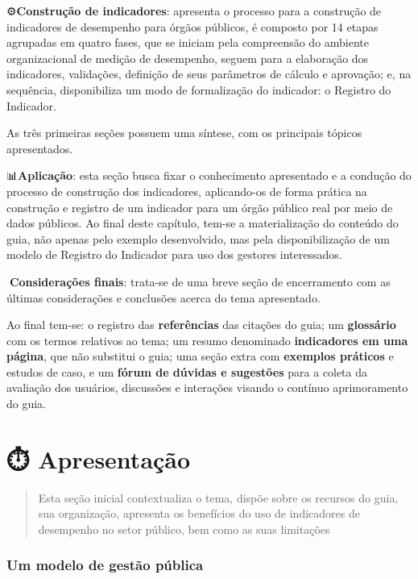 \documentclass[
  letterpaper,
  DIV=11,
  numbers=noendperiod]{scrreprt}
\begin{document}
⚙️\textbf{Construção de indicadores}: apresenta o processo para a
construção de indicadores de desempenho para órgãos públicos, é composto
por 14 etapas agrupadas em quatro fases, que se iniciam pela compreensão
do ambiente organizacional de medição de desempenho, seguem para a
elaboração dos indicadores, validações, definição de seus parâmetros de
cálculo e aprovação; e, na sequência, disponibiliza um modo de
formalização do indicador: o Registro do Indicador.

As três primeiras seções possuem uma síntese, com os principais tópicos
apresentados.

📊\textbf{Aplicação}: esta seção busca fixar o conhecimento apresentado
e a condução do processo de construção dos indicadores, aplicando-os de
forma prática na construção e registro de um indicador para um órgão
público real por meio de dados públicos. Ao final deste capítulo, tem-se
a materialização do conteúdo do guia, não apenas pelo exemplo
desenvolvido, mas pela disponibilização de um modelo de Registro do
Indicador para uso dos gestores interessados.

📝\textbf{Considerações finais}: trata-se de uma breve seção de
encerramento com as últimas considerações e conclusões acerca do tema
apresentado.

Ao final tem-se: o registro das \textbf{referências} das citações do
guia; um \textbf{glossário} com os termos relativos ao tema; um resumo
denominado \textbf{indicadores em uma página}, que não substitui o guia;
uma seção extra com \textbf{exemplos práticos} e estudos de caso, e um
\textbf{fórum de dúvidas e sugestões} para a coleta da avaliação dos
usuários, discussões e interações visando o contínuo aprimoramento do
guia.

\part{⏱️ Apresentação}

\begin{quote}
Esta seção inicial contextualiza o tema, dispõe sobre os recursos do
guia, sua organização, apresenta os benefícios do uso de indicadores de
desempenho no setor público, bem como as suas limitações
\end{quote}

\hypertarget{um-modelo-de-gestuxe3o-puxfablica}{%
\section*{Um modelo de gestão
pública}\label{um-modelo-de-gestuxe3o-puxfablica}}
\end{document}
